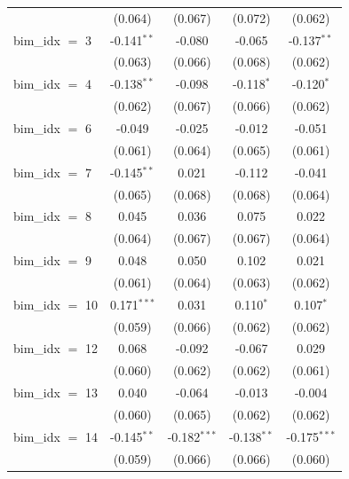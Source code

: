 \begin{tabular}{lcccc}
                       & (0.064)        & (0.067)        & (0.072)        & (0.062)\\   
   bim\_idx $=$ 3      & -0.141$^{**}$  & -0.080         & -0.065         & -0.137$^{**}$\\   
                       & (0.063)        & (0.066)        & (0.068)        & (0.062)\\   
   bim\_idx $=$ 4      & -0.138$^{**}$  & -0.098         & -0.118$^{*}$   & -0.120$^{*}$\\   
                       & (0.062)        & (0.067)        & (0.066)        & (0.062)\\   
   bim\_idx $=$ 6      & -0.049         & -0.025         & -0.012         & -0.051\\   
                       & (0.061)        & (0.064)        & (0.065)        & (0.061)\\   
   bim\_idx $=$ 7      & -0.145$^{**}$  & 0.021          & -0.112         & -0.041\\   
                       & (0.065)        & (0.068)        & (0.068)        & (0.064)\\   
   bim\_idx $=$ 8      & 0.045          & 0.036          & 0.075          & 0.022\\   
                       & (0.064)        & (0.067)        & (0.067)        & (0.064)\\   
   bim\_idx $=$ 9      & 0.048          & 0.050          & 0.102          & 0.021\\   
                       & (0.061)        & (0.064)        & (0.063)        & (0.062)\\   
   bim\_idx $=$ 10     & 0.171$^{***}$  & 0.031          & 0.110$^{*}$    & 0.107$^{*}$\\   
                       & (0.059)        & (0.066)        & (0.062)        & (0.062)\\   
   bim\_idx $=$ 12     & 0.068          & -0.092         & -0.067         & 0.029\\   
                       & (0.060)        & (0.062)        & (0.062)        & (0.061)\\   
   bim\_idx $=$ 13     & 0.040          & -0.064         & -0.013         & -0.004\\   
                       & (0.060)        & (0.065)        & (0.062)        & (0.062)\\   
   bim\_idx $=$ 14     & -0.145$^{**}$  & -0.182$^{***}$ & -0.138$^{**}$  & -0.175$^{***}$\\   
                       & (0.059)        & (0.066)        & (0.066)        & (0.060)\\   

\end{tabular}
